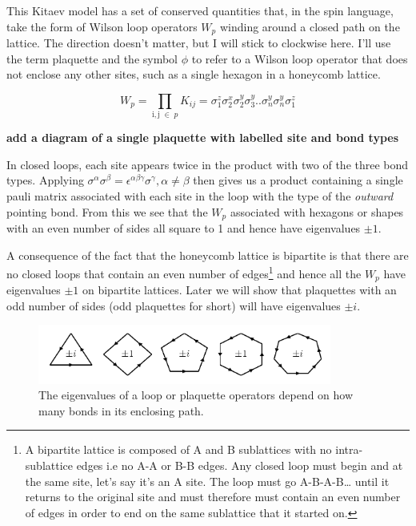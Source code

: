 This Kitaev model has a set of conserved quantities that, in the spin
language, take the form of Wilson loop operators \(W_p\) winding around
a closed path on the lattice. The direction doesn't matter, but I will
stick to clockwise here. I'll use the term plaquette and the symbol
\(\phi\) to refer to a Wilson loop operator that does not enclose any
other sites, such as a single hexagon in a honeycomb lattice.

\[W_p = \prod_{\mathrm{i,j}\; \in\; p} K_{ij} = \sigma_1^z \sigma_2^x \sigma_2^y \sigma_3^y .. \sigma_n^y \sigma_n^y \sigma_1^z\]

\textbf{add a diagram of a single plaquette with labelled site and bond
types}

In closed loops, each site appears twice in the product with two of the
three bond types. Applying
\(\sigma^\alpha \sigma^\beta = \epsilon^{\alpha \beta \gamma} \sigma^\gamma, \alpha \neq \beta\)
then gives us a product containing a single pauli matrix associated with
each site in the loop with the type of the \emph{outward} pointing bond.
From this we see that the \(W_p\) associated with hexagons or shapes
with an even number of sides all square to 1 and hence have eigenvalues
\(\pm 1\).

A consequence of the fact that the honeycomb lattice is bipartite is
that there are no closed loops that contain an even number of
edges\footnote{A bipartite lattice is composed of A and B sublattices
  with no intra-sublattice edges i.e no A-A or B-B edges. Any closed
  loop must begin and at the same site, let's say it's an A site. The
  loop must go A-B-A-B\ldots{} until it returns to the original site and
  must therefore must contain an even number of edges in order to end on
  the same sublattice that it started on.} and hence all the \(W_p\)
have eigenvalues \(\pm 1\) on bipartite lattices. Later we will show
that plaquettes with an odd number of sides (odd plaquettes for short)
will have eigenvalues \(\pm i\).

\begin{figure}
\hypertarget{fig:regular_plaquettes}{%
\centering
\includegraphics[width=0.86\textwidth,height=\textheight]{figure_code/amk_chapter/regular_plaquettes/regular_plaquettes.pdf}
\caption{The eigenvalues of a loop or plaquette operators depend on how
many bonds in its enclosing path.}\label{fig:regular_plaquettes}
}
\end{figure}

